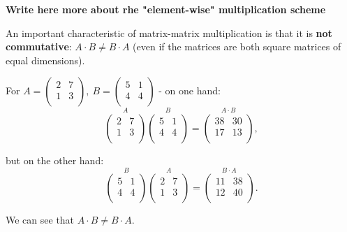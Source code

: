 \color{red}\textbf{Write here more about rhe "element-wise" multiplication scheme}\color{black}

An important characteristic of matrix-matrix multiplication is that it is \textbf{not commutative}: $A\cdot B\neq B\cdot A$ (even if the matrices are both square matrices of equal dimensions).
\begin{example}
 
  For $A=\begin{pmatrix}2 & 7\\1 & 3\\\end{pmatrix},\ B=\begin{pmatrix}5 & 1\\4 & 4\\\end{pmatrix}$ - on one hand:
  \begin{equation*}
	\overset{A}{
	  \begin{pmatrix}
		2 & 7\\
		1 & 3\\
	\end{pmatrix}}
	\overset{B}{
	  \begin{pmatrix}
		5 & 1\\
		4 & 4\\
	\end{pmatrix}}=
	\overset{A\cdot B}{
	  \begin{pmatrix}
		38 & 30\\
		17 & 13\\
	\end{pmatrix}},
  \end{equation*}

  but on the other hand:
  \begin{equation*}
	\overset{B}{
	  \begin{pmatrix}
		5 & 1\\
		4 & 4\\
	\end{pmatrix}}
	\overset{A}{
	  \begin{pmatrix}
		2 & 7\\
		1 & 3\\
	\end{pmatrix}}=
	\overset{B\cdot A}{
	  \begin{pmatrix}
		11 & 38\\
		12 & 40\\
	\end{pmatrix}}.
  \end{equation*}

  We can see that $A\cdot B \neq B\cdot A$.
\end{example}

